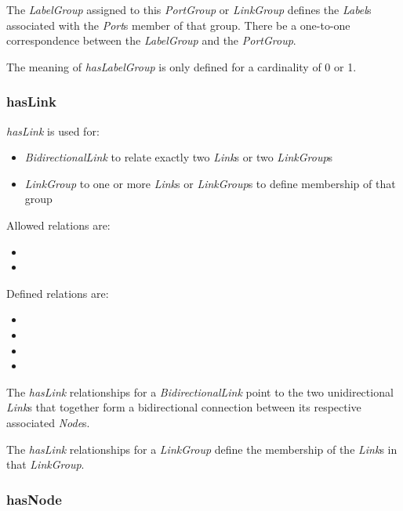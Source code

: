 The \emph{LabelGroup} assigned to this \emph{PortGroup} or \emph{LinkGroup} defines the \emph{Label}s associated with the \emph{Port}s member of that group. There  \MUST{} be a one-to-one correspondence between the \emph{LabelGroup} and the \emph{PortGroup}.

The meaning of \emph{hasLabelGroup} is only defined for a cardinality of 0 or 1.

\subsubsection{hasLink}%
\label{rel:hasLink}

\emph{hasLink} is used for:
    \begin{itemize}
        \item \emph{BidirectionalLink} to relate exactly two \emph{Link}s or two \emph{LinkGroup}s
        \item \emph{LinkGroup} to one or more \emph{Link}s or \emph{LinkGroup}s to define membership of that group
    \end{itemize}

Allowed relations are:
\begin{itemize}
    \item {}
    \item {}
\end{itemize}

Defined relations are:
\begin{itemize}
    \item {}
    \item {}
    \item {}
    \item {}
\end{itemize}

The \emph{hasLink} relationships for a \emph{BidirectionalLink} point to the two unidirectional \emph{Link}s that together form a bidirectional connection between its respective associated \emph{Node}s.

The \emph{hasLink} relationships for a \emph{LinkGroup} define the membership of the \emph{Link}s in that \emph{LinkGroup}.

\subsubsection{hasNode}%
\label{rel:hasNode}

